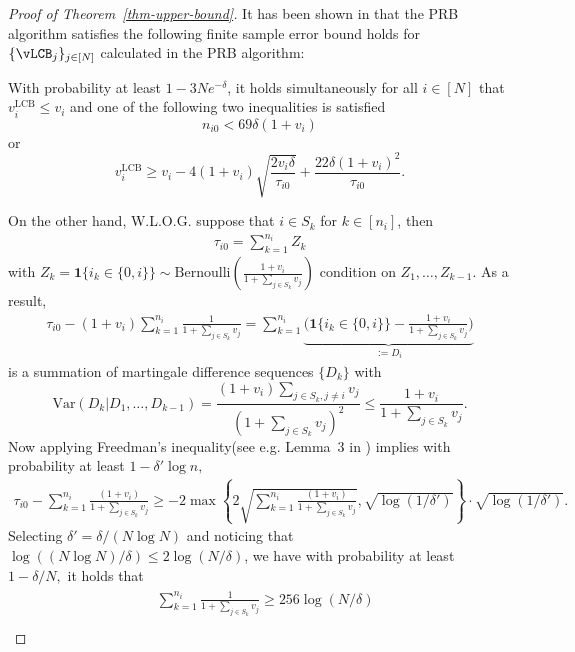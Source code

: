 \documentclass[10pt, letterpaper]{article}
\begin{document}
\begin{proof}[Proof of Theorem~\ref{thm-upper-bound}]
It has been shown in \citet{saha2024stop} that the PRB algorithm satisfies the following finite sample error bound holds for $\{\vLCB_j\}_{j\in [N]}$ calculated in the PRB algorithm:
\begin{proposition}\label{prop-vLCB}
   With probability at least $1-3 Ne^{-\delta}$, it holds simultaneously for all $i \in[N]$ that $ v^{\text{LCB}}_i \leq v_{i}$ and one of the following two inequalities is satisfied
$$
n_{i 0 }<69 \delta\left(1+v_i\right)
$$
or
$$
v_{i}^{\text{LCB}} \geq v_i - 4\left(1+v_i\right) \sqrt{\frac{2 v_i \delta}{\tau_{i 0}}}+\frac{22 \delta\left(1+v_i\right)^2}{\tau_{i 0}}.
$$
\end{proposition}


On the other hand, W.L.O.G. suppose that $i\in S_k$ for $k\in [n_i]$, then  \begin{align*}
    \tau_{i0} = \sum_{k = 1}^{n_i} Z_k 
\end{align*}
with $Z_k = \bm{1}\{i_k\in \{0,i\} \}\sim \text{Bernoulli}(\frac{1+v_i }{1+\sum_{j\in S_k} v_j})$ condition on $Z_1,\dots,Z_{k-1}$. As a result, \begin{align*}
    \tau_{i0} - (1+v_i)\sum_{k = 1}^{n_i}\frac{1}{1+\sum_{j\in S_k} v_j} = \sum_{k = 1}^{n_i}\underbrace{\big(\bm{1}\{i_k\in \{0,i\}\} - \frac{1+v_i}{1+\sum_{j\in S_k} v_j} \big)}_{:= D_i}
\end{align*}
is a summation of martingale difference sequences $\{D_k\}$ with $$\text{Var}(D_k\lvert D_1,\dots,D_{k-1})= \frac{(1+v_i)\sum_{j\in S_k,j\neq i} v_j}{(1+\sum_{j\in S_k} v_j)^2} \leq \frac{1+v_i}{1+\sum_{j\in S_k} v_j}.$$
Now applying Freedman's inequality(see e.g. Lemma~3 in \cite{rakhlin2012making}) implies with probability at least $1-\delta'\log n,$
\begin{align*}
    \tau_{i0} - \sum_{k = 1}^{n_i}\frac{(1+v_i)}{1+\sum_{j\in S_k} v_j}\geq -2 \max\left\{2\sqrt{\sum_{k = 1}^{n_i}\frac{(1+v_i)}{1+\sum_{j\in S_k} v_j}} ,\sqrt{\log(1/\delta')}\right\} \cdot \sqrt{\log(1/\delta')}.
\end{align*}
Selecting $\delta' = \delta/(N\log N)$ and noticing that $\log((N\log N )/\delta)\leq 2 \log(N/\delta)$, we have with probability at least $1-\delta/N,$ it holds that \begin{align}\label{eq-ni0-chernoff-bound}
    \begin{aligned}
    &\sum_{k = 1}^{n_i} \frac{1}{1+\sum_{j\in S_k} v_j}\geq 256 \log(N/\delta)\\

\end{aligned}
\end{align}
\end{proof}
\end{document}

